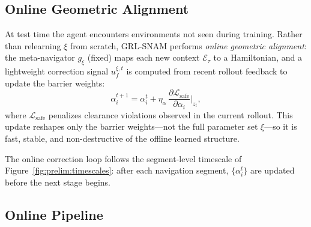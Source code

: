 \subsection{Online Geometric Alignment}
\label{subsec:ch3:online}

At test time the agent encounters environments not seen during training.
Rather than relearning $\xi$ from scratch, GRL-SNAM performs
\emph{online geometric alignment}: the meta-navigator $g_\xi$ (fixed)
maps each new context $\mathcal{E}_\tau$ to a Hamiltonian, and a
lightweight correction signal $u_f^{\xi,t}$ is computed from recent
rollout feedback to update the barrier weights:
\begin{equation}
  \alpha_i^{t+1}
  = \alpha_i^t
    + \eta_\alpha\,\frac{\partial \mathcal{L}_{\mathrm{safe}}}
                        {\partial \alpha_i}\Bigg|_{z_t},
  \label{eq:ch3:online_update}
\end{equation}
where $\mathcal{L}_{\mathrm{safe}}$ penalizes clearance violations
observed in the current rollout.
This update reshapes only the barrier weights—not the full parameter
set $\xi$—so it is fast, stable, and non-destructive of the offline
learned structure.

The online correction loop follows the segment-level timescale of
Figure~\ref{fig:prelim:timescales}: after each navigation segment,
$\{\alpha_i^t\}$ are updated before the next stage begins.

\subsection{Online Pipeline}
\label{subsec:ch3:pipeline}

